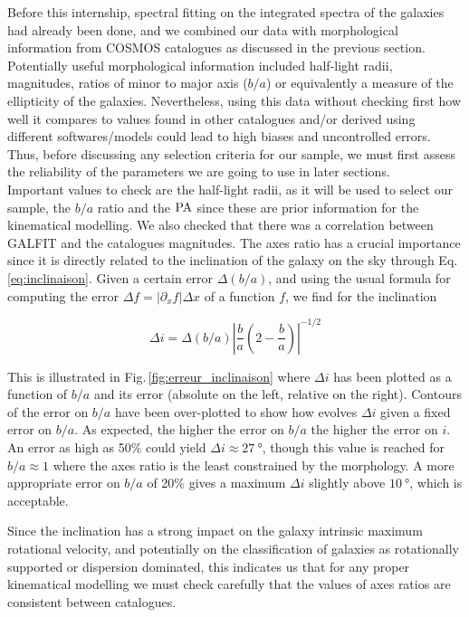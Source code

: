 Before this internship, spectral fitting on the integrated spectra of the galaxies had already been done, and we combined our data with morphological information from COSMOS catalogues as discussed in the previous section. Potentially useful morphological information included half-light radii, magnitudes, ratios of minor to major axis ($b/a$) or equivalently a measure of the ellipticity of the galaxies. Nevertheless, using this data without checking first how well it compares to values found in other catalogues and/or derived using different softwares/models could lead to high biases and uncontrolled errors. Thus, before discussing any selection criteria for our sample, we must first assess the reliability of the parameters we are going to use in later sections. \\

Important values to check are the half-light radii, as it will be used to select our sample, the $b/a$ ratio and the $\rm{PA}$ since these are prior information for the kinematical modelling. We also checked that there was a correlation between GALFIT and the catalogues magnitudes. The axes ratio has a crucial importance since it is directly related to the inclination of the galaxy on the sky through Eq.\,\ref{eq:inclinaison}. Given a certain error $\Delta (b/a)$, and using the usual formula for computing the error $\Delta f = | \partial_x f | \Delta x$ of a function $f$, we find for the inclination

\begin{equation}
	\Delta i = \Delta (b/a) \left | \frac{b}{a} \left ( 2 - \frac{b}{a} \right ) \right | ^{-1/2}
\end{equation}

This is illustrated in Fig.\,\ref{fig:erreur_inclinaison} where $\Delta i$ has been plotted as a function of $b/a$ and its error (absolute on the left, relative on the right). Contours of the error on $b/a$ have been over-plotted to show how evolves $\Delta i$ given a fixed error on $b/a$. As expected, the higher the error on $b/a$ the higher the error on $i$. An error as high as 50\% could yield $\Delta i \approx \SI{27}{\degree}$, though this value is reached for $b/a \approx 1$ where the axes ratio is the least constrained by the morphology. A more appropriate error on $b/a$ of 20\% gives a maximum $\Delta i$ slightly above $\SI{10}{\degree}$, which is acceptable. 

Since the inclination has a strong impact on the galaxy intrinsic maximum rotational velocity, and potentially on the classification of galaxies as rotationally supported or dispersion dominated, this indicates us that for any proper kinematical modelling we must check carefully that the values of axes ratios are consistent between catalogues.

